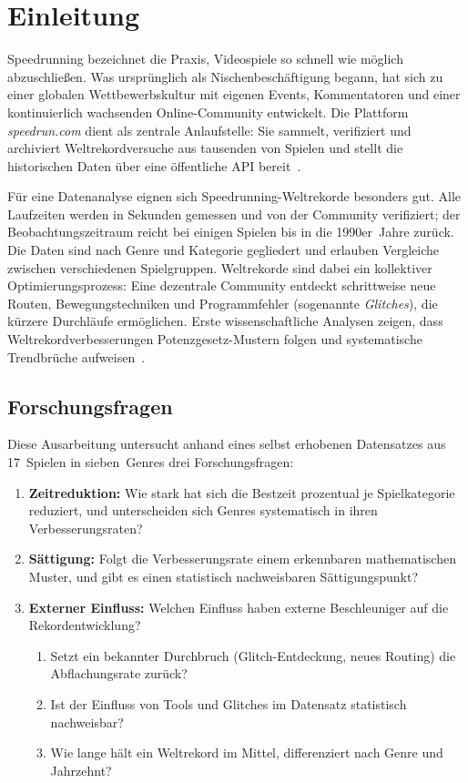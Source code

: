 \chapter{Einleitung}
\label{chap:einleitung}

Speedrunning bezeichnet die Praxis, Videospiele so schnell wie möglich abzuschließen. Was ursprünglich als Nischenbeschäftigung begann, hat sich zu einer globalen Wettbewerbskultur mit eigenen Events, Kommentatoren und einer kontinuierlich wachsenden Online-Community entwickelt. Die Plattform \textit{speedrun.com} dient als zentrale Anlaufstelle: Sie sammelt, verifiziert und archiviert Weltrekordversuche aus tausenden von Spielen und stellt die historischen Daten über eine öffentliche API bereit~\cite{speedruncom_api}.

Für eine Datenanalyse eignen sich Speedrunning-Weltrekorde besonders gut. Alle Laufzeiten werden in Sekunden gemessen und von der Community verifiziert; der Beobachtungszeitraum reicht bei einigen Spielen bis in die 1990er~Jahre zurück. Die Daten sind nach Genre und Kategorie gegliedert und erlauben Vergleiche zwischen verschiedenen Spielgruppen. Weltrekorde sind dabei ein kollektiver Optimierungsprozess: Eine dezentrale Community entdeckt schrittweise neue Routen, Bewegungstechniken und Programmfehler (sogenannte \emph{Glitches}), die kürzere Durchläufe ermöglichen. Erste wissenschaftliche Analysen zeigen, dass Weltrekordverbesserungen Potenzgesetz-Mustern folgen und systematische Trendbrüche aufweisen~\cite{erdil2023}.

\section*{Forschungsfragen}

Diese Ausarbeitung untersucht anhand eines selbst erhobenen Datensatzes aus 17~Spielen in sieben~Genres drei Forschungsfragen:

\begin{enumerate}
    \item \textbf{Zeitreduktion:} Wie stark hat sich die Bestzeit prozentual je Spielkategorie reduziert, und unterscheiden sich Genres systematisch in ihren Verbesserungsraten?
    \item \textbf{Sättigung:} Folgt die Verbesserungsrate einem erkennbaren mathematischen Muster, und gibt es einen statistisch nachweisbaren Sättigungspunkt?
    \item \textbf{Externer Einfluss:} Welchen Einfluss haben externe Beschleuniger auf die Rekordentwicklung?
    \begin{enumerate}
        \item[3a.] Setzt ein bekannter Durchbruch (Glitch-Entdeckung, neues Routing) die Abflachungsrate zurück?
        \item[3b.] Ist der Einfluss von Tools und Glitches im Datensatz statistisch nachweisbar?
        \item[3c.] Wie lange hält ein Weltrekord im Mittel, differenziert nach Genre und Jahrzehnt?
    \end{enumerate}
\end{enumerate}

